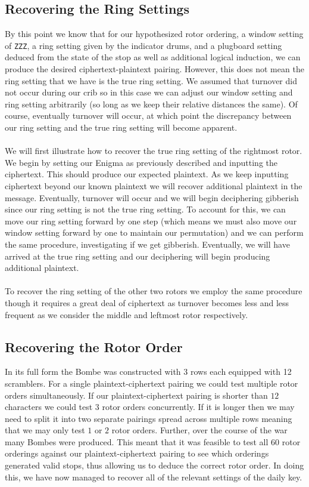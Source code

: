 \subsection{Recovering the Ring Settings}
By this point we know that for our hypothesized rotor ordering, a
window setting of \texttt{ZZZ}, a ring setting given by the indicator
drums, and a plugboard setting deduced from the state of the stop as
well as additional logical induction, we can produce the desired
ciphertext-plaintext pairing. However, this does not mean the ring
setting that we have is the true ring setting. We assumed that
turnover did not occur during our crib so in this case we can adjust
our window setting and ring setting arbitrarily (so long as we keep
their relative distances the same). Of course, eventually turnover
will occur, at which point the discrepancy between our ring setting
and the true ring setting will become apparent.
\\\\We will first illustrate how to recover the true ring setting of
the rightmost rotor. We begin by setting our Enigma as previously
described and inputting the ciphertext. This should produce our
expected plaintext. As we keep inputting ciphertext beyond our known
plaintext we will recover additional plaintext in the message.
Eventually, turnover will occur and we will begin deciphering
gibberish since our ring setting is not the true ring setting. To
account for this, we can move our ring setting forward by one step
(which means we must also move our window setting forward by one to
maintain our permutation) and we can perform the same procedure,
investigating if we get gibberish. Eventually, we will have arrived
at the true ring setting and our deciphering will begin producing
additional plaintext.
\\\\To recover the ring setting of the other two rotors we employ the
same procedure though it requires a great deal of ciphertext as
turnover becomes less and less frequent as we consider the middle and
leftmost rotor respectively.

\subsection{Recovering the Rotor Order}
In its full form the Bombe was constructed with $3$ rows each
equipped with 12 scramblers. For a single plaintext-ciphertext
pairing we could test multiple rotor orders simultaneously. If our
plaintext-ciphertext pairing is shorter than $12$ characters we could
test $3$ rotor orders concurrently. If it is longer then we may need
to split it into two separate pairings spread across multiple rows
meaning that we may only test $1$ or $2$ rotor orders. Further, over
the course of the war many Bombes were produced. This meant that it
was feasible to test all $60$ rotor orderings against our
plaintext-ciphertext pairing to see which orderings generated valid
stops, thus allowing us to deduce the correct rotor order. In doing
this, we have now managed to recover all of the relevant settings of
the daily key.

